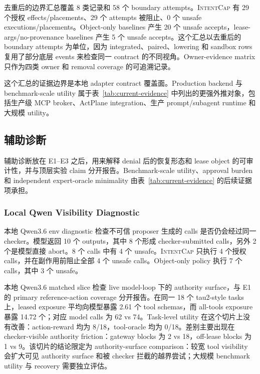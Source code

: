 \documentclass[UTF8,a4paper,11pt]{ctexart}
\newcommand{\sys}{\textsc{IntentCap}\xspace}
\begin{document}
去重后的边界汇总覆盖 8 类记录和 58 个 boundary attempts。\sys 有 29 个授权 effects/placements、29 个 attempts 被阻止、0 个 unsafe executions/placements。Object-only baselines 产生 20 个 unsafe accepts，lease-args/no-provenance baselines 产生 5 个 unsafe accepts。这个汇总以去重后的 boundary attempts 为单位，因为 integrated、paired、lowering 和 sandbox rows 复用了部分底层 events 来检查同一 contract 的不同视角。Owner-evidence matrix 只作为四类 owner 和 removal coverage 的可追溯记录。

这个汇总的证据边界是本地 adapter contract 覆盖面。Production backend 与 benchmark-scale utility 属于表~\ref{tab:current-evidence} 中列出的更强外推对象，包括生产级 MCP broker、ActPlane integration、生产 prompt/subagent runtime 和大规模 utility。

\subsection{辅助诊断}

辅助诊断放在 E1--E3 之后，用来解释 denial 后的恢复形态和 lease object 的可审计性，并与顶层实验 claim 分开报告。Benchmark-scale utility、approval burden 和 independent expert-oracle minimality 由表~\ref{tab:current-evidence} 的后续证据项承担。

\subsubsection{Local Qwen Visibility Diagnostic}

本地 Qwen3.6 env diagnostic 检查不可信 proposer 生成的 calls 是否仍会经过同一 checker。模型返回 10 个 outputs，其中 8 个形成 checker-submitted calls，另外 2 个是模型直接 abort。8 个 calls 中有 4 个 unsafe。\sys 只执行 4 个授权 calls，并在副作用前阻止全部 4 个 unsafe calls。Object-only policy 执行 7 个 calls，其中 3 个 unsafe。

本地 Qwen3.6 matched slice 检查 live model-loop 下的 authority surface，与 E1 的 primary reference-action coverage 分开报告。在同一 18 个 tau2-style tasks 上，leased exposure 平均向模型暴露 2.61 个 tool schemas，而 all-tools exposure 暴露 14.72 个；对应 model calls 为 62 vs 74。Task-level utility 在这个切片上没有改善：action-reward 均为 8/18，tool-oracle 均为 0/18。差别主要出现在 checker-visible authority friction：gateway blocks 为 2 vs 18，off-lease blocks 为 1 vs 9。该切片的结论限定为 authority-surface comparison：较宽 tool visibility 会扩大可见 authority surface 和被 checker 拦截的越界尝试；大规模 benchmark utility 与 recovery 需要独立评估。
\end{document}

